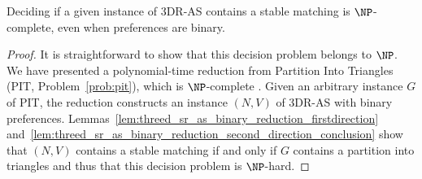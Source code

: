 \begin{thm}
\label{thm:threed_sr_as_binary_reduction}
Deciding if a given instance of 3DR-AS contains a stable matching is $\NP$-complete, even when preferences are binary.
\end{thm}
\begin{proof}
It is straightforward to show that this decision problem belongs to $\NP$. We have presented a polynomial-time reduction from Partition Into Triangles (PIT, Problem~\ref{prob:pit}), which is $\NP$-complete \cite{GJ79}. Given an arbitrary instance $G$ of PIT, the reduction constructs an instance $(N, V)$ of 3DR-AS with binary preferences. Lemmas~\ref{lem:threed_sr_as_binary_reduction_firstdirection} and~\ref{lem:threed_sr_as_binary_reduction_second_direction_conclusion} show that $(N, V)$ contains a stable matching if and only if $G$ contains a partition into triangles and thus that this decision problem is $\NP$-hard.
\end{proof}